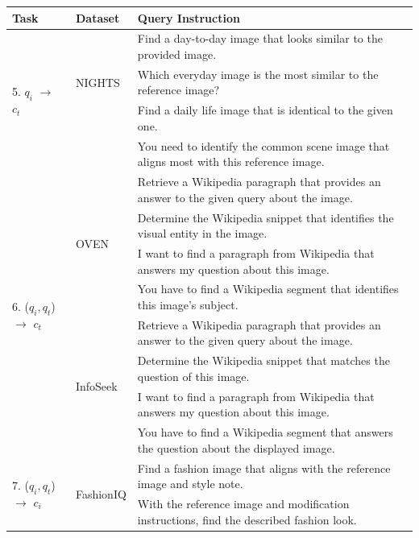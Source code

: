 \begin{table}
    \centering
    \scriptsize
    \begin{tabular}{l l l}
    \toprule
        \textbf{Task}        & \textbf{Dataset}             & \textbf{Query Instruction}                                               \\
        \midrule
         \multirow{4}{*}{5. $q_{i}$ $\to$ $c_t$} &      & Find a day-to-day image that looks similar to the provided image. \\
         &NIGHTS&Which everyday image is the most similar to the reference image? \\
         &&Find a daily life image that is identical to the given one. \\
         &&You need to identify the common scene image that aligns most with this reference image. \\
         \midrule
         \multirow{8}{*}{6. ($q_i, q_t$) $\to$ $c_t$} 
         & \multirow{4}{*}{OVEN}                          & Retrieve a Wikipedia paragraph that provides an answer to the given query about the image. \\
         && Determine the Wikipedia snippet that identifies the visual entity in the image. \\
         && I want to find a paragraph from Wikipedia that answers my question about this image. \\
         && You have to find a Wikipedia segment that identifies this image's subject. \\
         \cmidrule(lr){2-3}
         & \multirow{4}{*}{InfoSeek}                & Retrieve a Wikipedia paragraph that provides an answer to the given query about the image. \\
         &     & Determine the Wikipedia snippet that matches the question of this image. \\
         &     & I want to find a paragraph from Wikipedia that answers my question about this image. \\
         &     & You have to find a Wikipedia segment that answers the question about the displayed image. \\
         \midrule
         \multirow{8}{*}{7. ($q_i, q_t$) $\to$ $c_i$} 
         & \multirow{4}{*}{FashionIQ}                          & Find a fashion image that aligns with the reference image and style note. \\
         && With the reference image and modification instructions, find the described fashion look. \\

\end{tabular}
\end{table}
